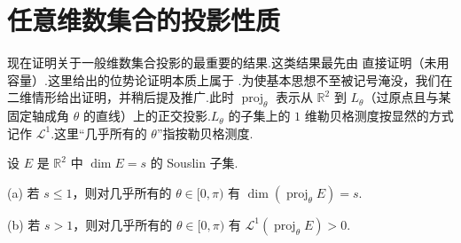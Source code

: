 \section{任意维数集合的投影性质}

现在证明关于一般维数集合投影的最重要的结果.这类结果最先由 \textcite{marstrand1954a} 直接证明（未用容量）.这里给出的位势论证明本质上属于 \textcite{kaufman1968}.为使基本思想不至被记号淹没，我们在二维情形给出证明，并稍后提及推广.此时 $\operatorname{proj}_{\theta}$ 表示从 $\mathbb{R}^2$ 到 $L_{\theta}$（过原点且与某固定轴成角 $\theta$ 的直线）上的正交投影.$L_{\theta}$ 的子集上的 $1$ 维勒贝格测度按显然的方式记作 $\mathscr{L}^1$.这里``几乎所有的 $\theta$''指按勒贝格测度.

\begin{theorem}\label{thm:6.8}
设 $E$ 是 $\mathbb{R}^2$ 中 $\dim E=s$ 的 Souslin 子集.

(a) 若 $s\leq 1$，则对几乎所有的 $\theta\in[0,\pi)$ 有 $\dim(\operatorname{proj}_{\theta}E)=s$.

(b) 若 $s>1$，则对几乎所有的 $\theta\in[0,\pi)$ 有 $\mathscr{L}^1(\operatorname{proj}_{\theta}E)>0$.
\end{theorem}


